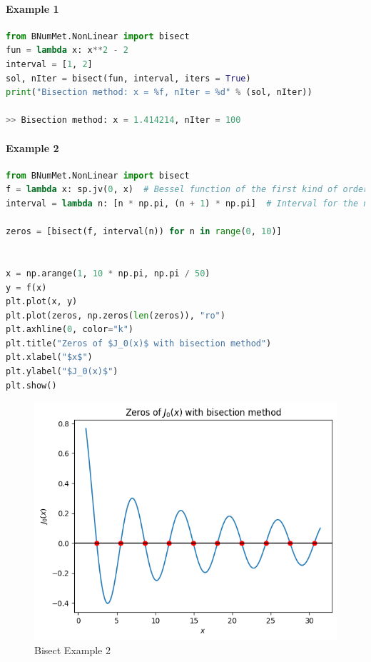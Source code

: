 \paragraph{Example 1}{
\begin{lstlisting}[language=Python]
from BNumMet.NonLinear import bisect
fun = lambda x: x**2 - 2
interval = [1, 2]
sol, nIter = bisect(fun, interval, iters = True)
print("Bisection method: x = %f, nIter = %d" % (sol, nIter))

>> Bisection method: x = 1.414214, nIter = 100
\end{lstlisting}
}
\paragraph{Example 2}{
\begin{lstlisting}[language=Python]
from BNumMet.NonLinear import bisect
f = lambda x: sp.jv(0, x)  # Bessel function of the first kind of order 0
interval = lambda n: [n * np.pi, (n + 1) * np.pi]  # Interval for the n-th zero

zeros = [bisect(f, interval(n)) for n in range(0, 10)]


x = np.arange(1, 10 * np.pi, np.pi / 50)
y = f(x)
plt.plot(x, y)
plt.plot(zeros, np.zeros(len(zeros)), "ro")
plt.axhline(0, color="k")
plt.title("Zeros of $J_0(x)$ with bisection method")
plt.xlabel("$x$")
plt.ylabel("$J_0(x)$")
plt.show()
\end{lstlisting}
\begin{figure}[H]
    \centering
    \includegraphics{Include/Images/Thesis/Documentation/NonLinear/Bisect Example 2.png}
    \caption{Bisect Example 2}
    \label{fig:Bisect Example 2}
\end{figure}
}